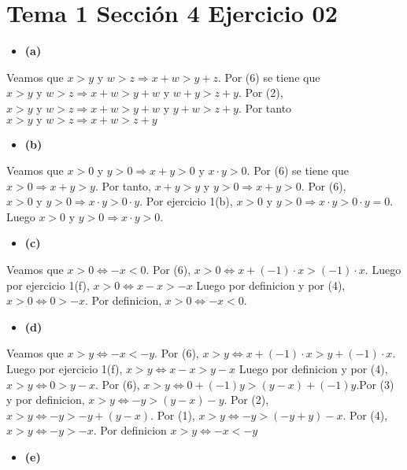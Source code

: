 \documentclass{article}
\begin{document}
\section{Tema 1 Sección 4 Ejercicio 02}
\begin{itemize}
\item \bf (a) \rm 
\end{itemize}
Veamos que \(x>y\text{ y }w>z\Longrightarrow x+w>y+z\). Por (6) se tiene que \(x>y\text{ y }w>z\Longrightarrow x+w>y+w\text{ y }w+y>z+y\). Por (2), \(x>y\text{ y }w>z\Longrightarrow x+w>y+w\text{ y }y+w>z+y\). Por tanto \(x>y\text{ y }w>z\Longrightarrow x+w>z+y\)
\begin{itemize}
\item \bf (b) \rm 
\end{itemize}
Veamos que \(x>0\text{ y }y>0\Longrightarrow x+y>0 \text{ y }x\cdot y>0\). Por (6) se tiene que \(x>0\Longrightarrow x+y>y\). Por tanto, \(x+y>y\text{ y }y>0\Longrightarrow x+y>0\). Por (6), \(x>0\text{ y }y>0\Longrightarrow x\cdot y >0\cdot y\). Por ejercicio 1(b),  \(x>0\text{ y }y>0\Longrightarrow x\cdot y >0\cdot y=0\). Luego \(x>0\text{ y } y>0\Longrightarrow x\cdot y >0\).
\begin{itemize}
\item \bf (c) \rm 
\end{itemize}
Veamos que \(x>0 \Longleftrightarrow -x<0 \). Por (6), \(x>0 \Longleftrightarrow   x+\left(-1\right)\cdot x>\left(-1\right)\cdot x\). Luego por ejercicio 1(f), \(x>0 \Longleftrightarrow x-x>-x\)
 Luego por definicion y por (4), \(x>0 \Longleftrightarrow 0>-x\). Por definicion, \(x>0 \Longleftrightarrow -x<0\).
\begin{itemize}
\item \bf (d) \rm 
\end{itemize}
Veamos que \(x>y \Longleftrightarrow -x<-y\). Por (6), \(x>y\Longleftrightarrow   x+\left(-1\right)\cdot x>y+\left(-1\right)\cdot x\). Luego por ejercicio 1(f), \(x>y\Longleftrightarrow x-x>y-x\)
 Luego por definicion y por (4), \(x>y\Longleftrightarrow 0>y-x\). Por (6), \(x>y\Longleftrightarrow 0+(-1)y>(y-x)+(-1)y\).Por (3) y por definicion, \(x>y\Longleftrightarrow -y>(y-x)-y\). Por (2), \(x>y\Longleftrightarrow -y>-y+(y-x)\). Por (1), \(x>y\Longleftrightarrow -y>(-y+y)-x\). Por (4), \(x>y\Longleftrightarrow -y>-x\). Por definicion \(x>y\Longleftrightarrow -x<-y\)
\begin{itemize}
\item \bf (e) \rm 
\end{itemize}
\end{document}
